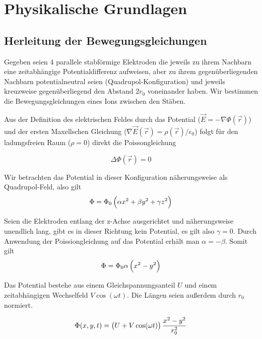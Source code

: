 \documentclass[a4paper,german,12pt,smallheadings]{scrartcl}
\begin{document}
\begin{titlepage}

\end{titlepage}

\allowdisplaybreaks %

\section{Physikalische Grundlagen}
\subsection{Herleitung der Bewegungsgleichungen}

Gegeben seien 4 parallele stabförmige Elektroden die jeweils zu ihrem Nachbarn
eine zeitabhängige Potentialdifferenz aufweisen, aber zu ihrem
gegenüberliegenden Nachbarn potentialneutral seien (Quadrupol-Konfiguration)
und jeweils kreuzweise gegenüberliegend den Abstand $2r_0$ voneinander haben.
Wir bestimmen die Bewegungsgleichungen eines Ions zwischen den Stäben.

Aus der Definition des elektrischen Feldes durch das Potential
($\vec{E} = - \nabla \Phi(\vec{r})$) und der ersten Maxellschen Gleichung
($\nabla \vec{E}(\vec{r}) = \rho(\vec{r}) / \epsilon_0$) folgt für den ladungsfreien
Raum ($\rho = 0$) direkt die Poissongleichung

\begin{equation}
  \Delta \Phi(\vec{r}) = 0
\end{equation}

Wir betrachten das Potential in dieser Konfiguration näherungsweise als
Quadrupol-Feld, also gilt
\begin{equation}
  \Phi = \Phi_0 \del{\alpha x^2 + \beta y^2 + \gamma z^2}
\end{equation}

Seien die Elektroden entlang der z-Achse ausgerichtet und näherungsweise
unendlich lang, gibt es in dieser Richtung kein Potential, es gilt also $\gamma
= 0$. Durch Anwendung der Poissiongleichung auf das Potential erhält man
$\alpha = -\beta$. Somit gilt
\begin{equation}
  \Phi = \Phi_0 \alpha \del{x^2 - y^2}
\end{equation}

Das Potential bestehe aus einem Gleichspannungsanteil $U$ und einem
zeitabhängigen Wechselfeld $V \cos(\omega t)$. Die Längen seien außerdem durch
$r_0$ normiert.

\begin{equation}
  \Phi(x,y,t) = \del{U + V \cos(\omega t)} \frac{x^2-y^2}{r_0^2}
\end{equation}
\end{document}
